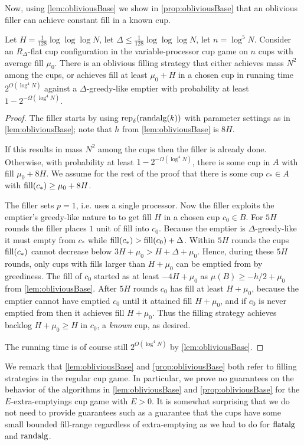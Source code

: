 Now, using \cref{lem:obliviousBase} we show in
\cref{prop:obliviousBase} that an oblivious filler can achieve
constant fill in a known cup. 
\begin{proposition}
  \label{prop:obliviousBase}
  Let $H = \frac{1}{128}\log\log\log N$, let $\Delta \le
  \frac{1}{128}\log\log\log N$, let $n = \log^5 N$. 
  Consider an $R_\Delta$-flat cup configuration in the
  variable-processor cup game on $n$ cups with average fill $\mu_0$.
  There is an oblivious filling strategy that either
  achieves mass $N^2$ among the cups, or achieves fill at least $\mu_0 + H$
  in a chosen cup in running time $2^{O(\log^4 N)}$ against a
  $\Delta$-greedy-like emptier with probability at least
  $1-2^{-\Omega(\log^4 N)}.$
\end{proposition}
\begin{proof}
  The filler starts by using $\operatorname{\text{\textup{rep}}}_\delta(\operatorname{\text{\textup{randalg}}}(k))$ with
  parameter settings as in \cref{lem:obliviousBase};
  note that $h$ from \cref{lem:obliviousBase} is $8H$.

  If this results in mass $N^2$ among the cups then the filler is
  already done. Otherwise, with probability at least
  $1-2^{-\Omega(\log^4 N)}$, there is some cup in $A$ with fill
  $\mu_0 + 8H$. We assume for the rest of the proof that there is
  some cup $c_* \in A$ with $\operatorname{\text{\textup{fill}}}(c_*) \ge \mu_0 + 8H$.

  The filler sets $p=1$, i.e. uses a single processor. Now the
  filler exploits the emptier's greedy-like nature to to get fill
  $H$ in a chosen cup $c_0 \in B$. For $5H$ rounds
  the filler places $1$ unit of fill into $c_0$. Because the
  emptier is $\Delta$-greedy-like it must empty from $c_*$ 
  while $\operatorname{\text{\textup{fill}}}(c_*) > \operatorname{\text{\textup{fill}}}(c_0) + \Delta$. Within $5H$ rounds
  the cups $\operatorname{\text{\textup{fill}}}(c_*)$ cannot decrease below $3H+\mu_0 > H + \Delta + \mu_0$.
  Hence, during these $5H$ rounds, only cups with fills larger
  than $H + \mu_0$ can be emptied from by greediness. 
  The fill of $c_0$ started as at least
  $-4H+\mu_0$ as $\mu(B) \ge -h/2+\mu_0$ from
  \cref{lem:obliviousBase}. After $5H$ rounds
  $c_0$ has fill at least $H+\mu_0$, because the emptier cannot
  have emptied $c_0$ until it attained fill $H+\mu_0$, and if
  $c_0$ is never emptied from then it achieves fill $H+\mu_0$.
  Thus the filling strategy achieves backlog $H+\mu_0 \ge H$
  in $c_0$, a \emph{known} cup, as desired.

  The running time is of course still $2^{O(\log^4 N)}$ by
  \cref{lem:obliviousBase}.
\end{proof}


We remark that \cref{lem:obliviousBase} and
\cref{prop:obliviousBase} both refer to filling strategies in
the regular cup game. In particular, we prove no guarantees on
the behavior of the algorithms in \cref{lem:obliviousBase} and
\cref{prop:obliviousBase} for the $E$-extra-emptyings cup game
with $E > 0$. It is somewhat surprising that we do not need to
provide guarantees such as a guarantee that the cups have some
small bounded fill-range regardless of extra-emptying as we had
to do for $\operatorname{\text{\textup{flatalg}}}$ and $\operatorname{\text{\textup{randalg}}}$.

